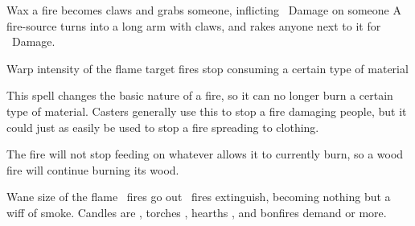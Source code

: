   {\mFire}%
  {Wax}%
  {\detailed}%
  {}%
  {a fire becomes claws and grabs someone, inflicting \rollConv\ Damage on someone}%
  {
    A fire-source turns into a long arm with claws, and rakes anyone next to it for \rollConv~Damage.
  }

  {\mFire}%
  {Warp}%
  {\duplicated}%
  {intensity of the flame}%
  {target fires stop consuming a certain type of material}%
  {
    This spell changes the basic nature of a fire, so it can no longer burn a certain type of material.
    Casters generally use this to stop a fire damaging people, but it could just as easily be used to stop a fire spreading to clothing.

    The fire will not stop feeding on whatever allows it to currently burn, so a wood fire will continue burning its wood.
  }

  {\mFire}%
  {Wane}%
  {\duplicated}%
  {size of the flame}%
  {\spellArea\ fires go out}%
  {
    \spellArea\ fires extinguish, becoming nothing but a wiff of smoke.
    Candles are \tn[6], torches \tn[7], hearths \tn[8], and bonfires demand \tn[9] or more.
  }
